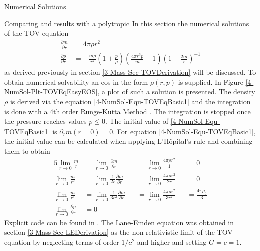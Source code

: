 \begin{section}{Numerical Solutions}
\begin{subsection}{Comparing  and  results with a polytropic }
\label{4-NumSol-Sec-Comp-TOV-LE}
In this section the numerical solutions of the \ac{TOV} equation
\begin{align}
	\frac{\partial m}{\partial r} &= 4\pi\rho r^2\label{4-NumSol-Equ-TOVEqBasic1}\\
	\frac{\partial p}{\partial r} &=-\frac{m\rho}{r^2}\left(1+\frac{p}{\rho}\right)\left(\frac{4\pi r^3 p}{m}+1\right)\left(1-\frac{2m}{r}\right)^{-1}
	\label{4-NumSol-Equ-TOVEqBasic2}
\end{align}
as derived previously in section \ref{3-Mass-Sec-TOVDerivation} will be discussed.
To obtain numerical solvability an \ac{eos} in the form $\rho(r,p)$ is supplied.
In Figure \ref{4-NumSol-Plt-TOVEqEasyEOS}, a plot of such a solution is presented.
The density $\rho$ is derived via the equation \eqref{4-NumSol-Equ-TOVEqBasic1} and the integration is done with a 4th order Runge-Kutta Method \cite{rungeUeberNumerischeAufloesung1895, schlömilch1901zeitschrift, h.SimplifiedDerivationAnalysis2010}.
The integration is stopped once the pressure reaches values $p\leq0$.
The initial value of \eqref{4-NumSol-Equ-TOVEqBasic1} is $\partial_r m(r=0)=0$.
For equation \eqref{4-NumSol-Equ-TOVEqBasic1}, the initial value can be calculated when applying L'Hôpital's rule and combining them to obtain
\begin{alignat}{5}
	\lim\limits_{r\rightarrow0}\frac{m}{r} &= \lim\limits_{r\rightarrow0}\frac{\partial m}{\partial r} &&=\lim\limits_{r\rightarrow0}\frac{4\pi\rho r^2}{1} &&= 0\\
	\lim\limits_{r\rightarrow0}\frac{m}{r^2} &= \lim\limits_{r\rightarrow0}\frac{1}{2r}\frac{\partial m}{\partial r}  &&= \lim\limits_{r\rightarrow0}\frac{4\pi\rho r^2}{2r} &&= 0\\
	\lim\limits_{r\rightarrow0}\frac{m}{r^3} &= \lim\limits_{r\rightarrow0}\frac{1}{3r^2}\frac{\partial m}{\partial r} &&=\lim\limits_{r\rightarrow0}\frac{4\pi\rho r^2}{3r^2} &&= \frac{4\pi\rho_0}{3}\\
	\lim\limits_{r\rightarrow0}\frac{\partial p}{\partial r} &= 0
\end{alignat}
Explicit code can be found in \cite{pleyerGithubRepositoryJonas2021}.
The Lane-Emden equation was obtained in section \ref{3-Mass-Sec-LEDerivation} as the non-relativistic limit of the \ac{TOV} equation by neglecting terms of order $1/c^2$ and higher and setting $G=c=1$.

\end{subsection}
\end{section}
